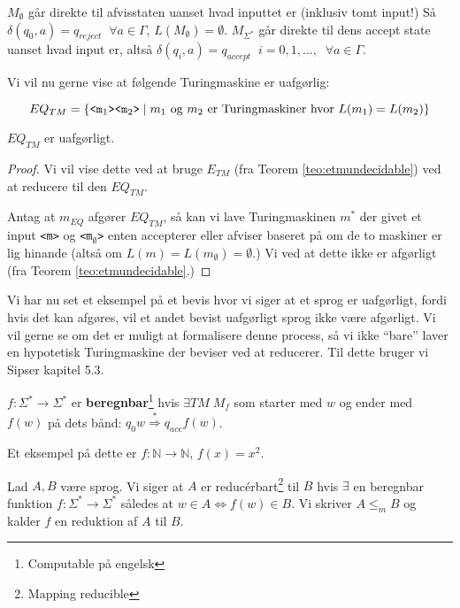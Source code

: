 $M_{\emptyset}$ går direkte til afvisstaten uanset hvad inputtet er (inklusiv tomt input!) Så $\delta(q_{0}, a) = q_{reject} \;\; \forall a \in \Gamma$, $L(M_{\emptyset}) = \emptyset$.
$M_{\Sigma^{*}}$ går direkte til dens accept state uanset hvad input er, altså $\delta(q_{i}, a) = q_{accept} \;\; i = 0, 1, \ldots, \; \; \forall a \in \Gamma$.

Vi vil nu gerne vise at følgende Turingmaskine er uafgørlig:

\begin{equation*}
	EQ_{TM} = \{\text{\texttt{<m$_1$><m$_2$>}} \mid m_{1} \text{ og } m_{2} \text{ er Turingmaskiner hvor } L(m_{1}) = L(m_{2})\}
\end{equation*}

\begin{theorem}
	$EQ_{TM}$ er uafgørligt.
\end{theorem}

\begin{proof}
	Vi vil vise dette ved at bruge $E_{TM}$ (fra Teorem \ref{teo:etmundecidable}) ved at reducere til den $EQ_{TM}$.

	Antag at $m_{EQ}$ afgører $EQ_{TM}$, så kan vi lave Turingmaskinen $m^{*}$ der givet et input \texttt{<m>} og \texttt{<m$_{\emptyset}$>} enten accepterer eller afviser baseret på om de to maskiner er lig hinande (altså om $L(m) = L(m_{\emptyset}) = \emptyset$.) Vi ved at dette ikke er afgørligt (fra Teorem \ref{teo:etmundecidable}.)
\end{proof}

Vi har nu set et eksempel på et bevis hvor vi siger at et sprog er uafgørligt, fordi hvis det kan afgøres, vil et andet bevist uafgørligt sprog ikke være afgørligt. Vi vil gerne se om det er muligt at formalisere denne process, så vi ikke ``bare'' laver en hypotetisk Turingmaskine der beviser ved at reducerer. Til dette bruger vi Sipser kapitel 5.3.
\begin{definition}
	$f : \Sigma^{*} \rightarrow \Sigma^{*}$ er \textbf{beregnbar}\footnote{Computable på engelsk} hvis $\exists TM \;M_{f}$ som starter med $w$ og ender med $f(w)$ på dets bånd: $q_{0}w \stackrel{*}{\Rightarrow} q_{acc}f(w)$.
\end{definition}

Et eksempel på dette er $f : \mathbb{N} \rightarrow \mathbb{N}$, $f(x) = x^{2}$.

\begin{definition}
	Lad $A, B$ være sprog. Vi siger at $A$ er reducérbart\footnote{Mapping reducible} til $B$ hvis $\exists$ en beregnbar funktion $f : \Sigma^{*} \rightarrow \Sigma^{*}$ således at $w \in A \iff f(w) \in B$. Vi skriver $A \le _{m}B$ og kalder $f$ en reduktion af $A$ til $B$.
\end{definition}

